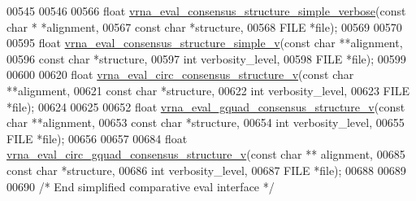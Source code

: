 \begin{DoxyCode}
00545 
00546 
00566 \textcolor{keywordtype}{float} \hyperlink{group__eval_ga1c07851f6b665c3461a19e9e4eb33d26}{vrna\_eval\_consensus\_structure\_simple\_verbose}(\textcolor{keyword}{const} \textcolor{keywordtype}{char} *
      *alignment,
00567                                                    \textcolor{keyword}{const} \textcolor{keywordtype}{char} *structure,
00568                                                    FILE       *file);
00569 
00570 
00595 \textcolor{keywordtype}{float} \hyperlink{group__eval_gad88927c62ab0a8b534e078e44be1b36e}{vrna\_eval\_consensus\_structure\_simple\_v}(\textcolor{keyword}{const} \textcolor{keywordtype}{char} **alignment,
00596                                              \textcolor{keyword}{const} \textcolor{keywordtype}{char} *structure,
00597                                              \textcolor{keywordtype}{int}        verbosity\_level,
00598                                              FILE       *file);
00599 
00600 
00620 \textcolor{keywordtype}{float} \hyperlink{group__eval_gae89240c230e4740b22a703ee953396b9}{vrna\_eval\_circ\_consensus\_structure\_v}(\textcolor{keyword}{const} \textcolor{keywordtype}{char} **alignment,
00621                                            \textcolor{keyword}{const} \textcolor{keywordtype}{char} *structure,
00622                                            \textcolor{keywordtype}{int}        verbosity\_level,
00623                                            FILE       *file);
00624 
00625 
00652 \textcolor{keywordtype}{float} \hyperlink{group__eval_ga8abc794fc48d43268ced5e8cde017baa}{vrna\_eval\_gquad\_consensus\_structure\_v}(\textcolor{keyword}{const} \textcolor{keywordtype}{char}  **alignment,
00653                                             \textcolor{keyword}{const} \textcolor{keywordtype}{char}  *structure,
00654                                             \textcolor{keywordtype}{int}         verbosity\_level,
00655                                             FILE        *file);
00656 
00657 
00684 \textcolor{keywordtype}{float} \hyperlink{group__eval_gaecd3e17292a0b3927277434019a5e187}{vrna\_eval\_circ\_gquad\_consensus\_structure\_v}(\textcolor{keyword}{const} \textcolor{keywordtype}{char} **
      alignment,
00685                                                  \textcolor{keyword}{const} \textcolor{keywordtype}{char} *structure,
00686                                                  \textcolor{keywordtype}{int}        verbosity\_level,
00687                                                  FILE       *file);
00688 
00689 
00690 \textcolor{comment}{/* End simplified comparative eval interface */}

\end{DoxyCode}
